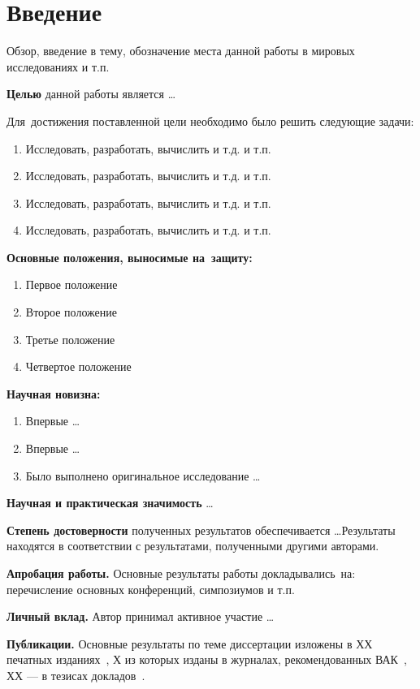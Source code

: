 \chapter*{Введение}							%
Обзор, введение в тему, обозначение места данной работы в мировых исследованиях и т.п.

\textbf{Целью} данной работы является \ldots

Для~достижения поставленной цели необходимо было решить следующие задачи:
\begin{enumerate}
  \item Исследовать, разработать, вычислить и т.д. и т.п.
  \item Исследовать, разработать, вычислить и т.д. и т.п.
  \item Исследовать, разработать, вычислить и т.д. и т.п.
  \item Исследовать, разработать, вычислить и т.д. и т.п.
\end{enumerate}

\textbf{Основные положения, выносимые на~защиту:}
\begin{enumerate}
  \item Первое положение
  \item Второе положение
  \item Третье положение
  \item Четвертое положение
\end{enumerate}

\textbf{Научная новизна:}
\begin{enumerate}
  \item Впервые \ldots
  \item Впервые \ldots
  \item Было выполнено оригинальное исследование \ldots
\end{enumerate}

\textbf{Научная и практическая значимость} \ldots

\textbf{Степень достоверности} полученных результатов обеспечивается \ldots Результаты находятся в соответствии с результатами, полученными другими авторами.

\textbf{Апробация работы.}
Основные результаты работы докладывались~на:
перечисление основных конференций, симпозиумов и т.п.

\textbf{Личный вклад.} Автор принимал активное участие \ldots

\textbf{Публикации.} Основные результаты по теме диссертации изложены в ХХ печатных изданиях~\cite{Sychev,Sokolov,Gaidaenko,Lermontov,Management},
Х из которых изданы в журналах, рекомендованных ВАК~\cite{Sychev,Sokolov,Gaidaenko}, 
ХХ --- в тезисах докладов~\cite{Lermontov,Management}.

